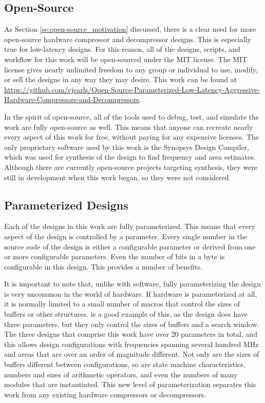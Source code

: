 \documentclass[doublespace,nopageskip]{VTthesis}
\begin{document}
\subsection{Open-Source}\label{ss:open-source}
As Section \ref{se:open-source_motivation} discussed, there is a clear need for more open-source hardware compressor and decompressor designs. This is especially true for low-latency designs. For this reason, all of the designs, scripts, and workflow for this work will be open-sourced under the MIT license. The MIT license gives nearly unlimited freedom to any group or individual to use, modify, or sell the designs in any way they may desire. This work can be found at \href{https://github.com/cjearls/Open-Source-Parameterized-Low-Latency-Aggressive-Hardware-Compressors-and-Decompressors}{https://github.com/cjearls/Open-Source-Parameterized-Low-Latency-Aggressive-Hardware-Compressors-and-Decompressors}.

In the spirit of open-source, all of the tools used to debug, test, and simulate the work are fully open-source as well. This means that anyone can recreate nearly every aspect of this work for free, without paying for any expensive licenses. The only proprietary software used by this work is the Synopsys Design Compiler, which was used for synthesis of the design to find frequency and area estimates. Although there are currently open-source projects targeting synthesis, they were still in development when this work began, so they were not considered.

\subsection{Parameterized Designs}\label{ss:parameterized}
Each of the designs in this work are fully parameterized. This means that every aspect of the design is controlled by a parameter. Every single number in the source code of the design is either a configurable parameter or derived from one or more configurable parameters. Even the number of bits in a byte is configurable in this design. This provides a number of benefits.

It is important to note that, unlike with software, fully parameterizing the design is very uncommon in the world of hardware. If hardware is parameterized at all, it is normally limited to a small number of macros that control the sizes of buffers or other structures. \cite{hdldeflate} is a good example of this, as the design does have three parameters, but they only control the sizes of buffers and a search window. The three designs that comprise this work have over 20 parameters in total, and this allows design configurations with frequencies spanning several hundred MHz and areas that are over an order of magnitude different. Not only are the sizes of buffers different between configurations, so are state machine characteristics, numbers and sizes of arithmetic operators, and even the numbers of many modules that are instantiated. This new level of parameterization separates this work from any existing hardware compressors or decompressors.
\end{document}
